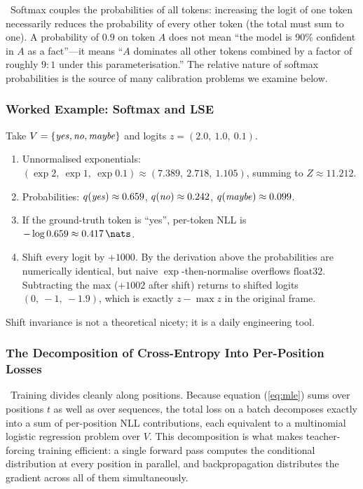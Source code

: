 \Cons\ Softmax couples the probabilities of all tokens: increasing the
logit of one token necessarily reduces the probability of every other
token (the total must sum to one). A probability of $0.9$ on token $A$
does not mean ``the model is 90\% confident in $A$ as a fact''---it
means ``$A$ dominates all other tokens combined by a factor of roughly
$9{:}1$ under this parameterisation.'' The relative nature of softmax
probabilities is the source of many calibration problems we examine
below.

\subsubsection{Worked Example: Softmax and LSE}

\begin{workedexample}
Take $V = \{\text{\emph{yes}}, \text{\emph{no}}, \text{\emph{maybe}}\}$
and logits $z = (2.0,\ 1.0,\ 0.1)$.
\begin{enumerate}
  \item Unnormalised exponentials: $(\exp 2,\ \exp 1,\ \exp 0.1)
  \approx (7.389,\ 2.718,\ 1.105)$, summing to $Z \approx 11.212$.
  \item Probabilities:
  $q(\text{\emph{yes}}) \approx 0.659$,
  $q(\text{\emph{no}}) \approx 0.242$,
  $q(\text{\emph{maybe}}) \approx 0.099$.
  \item If the ground-truth token is ``yes'', per-token NLL is
  $-\log 0.659 \approx 0.417\,\nats$.
  \item Shift every logit by $+1000$. By the derivation above the
  probabilities are numerically identical, but naive
  $\exp$-then-normalise overflows $\mathrm{float32}$. Subtracting the
  max ($+1002$ after shift) returns to shifted logits
  $(0,\ -1,\ -1.9)$, which is exactly $z - \max z$ in the original
  frame.
\end{enumerate}
Shift invariance is not a theoretical nicety; it is a daily
engineering tool.
\end{workedexample}

\subsubsection{The Decomposition of Cross-Entropy Into Per-Position Losses}

\Cons\ Training divides cleanly along positions. Because equation
(\ref{eq:mle}) sums over positions $t$ as well as over sequences, the
total loss on a batch decomposes exactly into a sum of per-position NLL
contributions, each equivalent to a multinomial logistic regression
problem over $V$. This decomposition is what makes teacher-forcing
training efficient: a single forward pass computes the conditional
distribution at every position in parallel, and backpropagation
distributes the gradient across all of them simultaneously.

